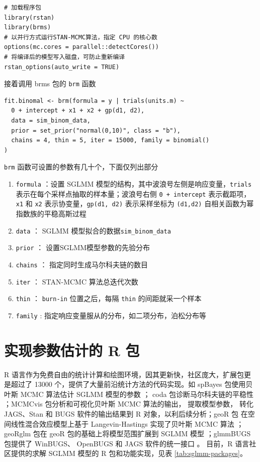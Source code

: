 \documentclass[12pt,a4paper,UTF8,twoside]{book}
\providecommand{\tightlist}{%
  \setlength{\itemsep}{0pt}\setlength{\parskip}{0pt}}
\theoremstyle{definition}
\theoremstyle{definition}
\theoremstyle{definition}
\theoremstyle{remark}
\begin{document}
\begin{verbatim}
# 加载程序包
library(rstan)
library(brms)
# 以并行方式运行STAN-MCMC算法，指定 CPU 的核心数
options(mc.cores = parallel::detectCores())
# 将编译后的模型写入磁盘，可防止重新编译
rstan_options(auto_write = TRUE)
\end{verbatim}

\noindent 接着调用 brms 包的 \texttt{brm} 函数

\begin{verbatim}
fit.binomal <- brm(formula = y | trials(units.m) ~ 
  0 + intercept + x1 + x2 + gp(d1, d2), 
  data = sim_binom_data,
  prior = set_prior("normal(0,10)", class = "b"),
  chains = 4, thin = 5, iter = 15000, family = binomial()
)    
\end{verbatim}

\texttt{brm} 函数可设置的参数有几十个，下面仅列出部分

\begin{enumerate}
\def\labelenumi{\arabic{enumi}.}
\tightlist
\item
  \texttt{formula} ：设置 SGLMM
  模型的结构，其中波浪号左侧是响应变量，\texttt{trials}
  表示在每个采样点抽取的样本量；波浪号右侧 \texttt{0\ +\ intercept}
  表示截距项， \texttt{x1} 和 \texttt{x2}
  表示协变量，\texttt{gp(d1,\ d2)} 表示采样坐标为 \texttt{(d1,d2)}
  自相关函数为幂指数族的平稳高斯过程
\item
  \texttt{data} ： SGLMM 模型拟合的数据\texttt{sim\_binom\_data}
\item
  \texttt{prior} ： 设置SGLMM模型参数的先验分布
\item
  \texttt{chains} ： 指定同时生成马尔科夫链的数目
\item
  \texttt{iter} ： STAN-MCMC 算法总迭代次数
\item
  \texttt{thin} ： \texttt{burn-in} 位置之后，每隔 \texttt{thin}
  的间距就采一个样本
\item
  \texttt{family} : 指定响应变量服从的分布，如二项分布，泊松分布等
\end{enumerate}

\hypertarget{subsec:sglmm-with-r}{%
\section{实现参数估计的 R 包}\label{subsec:sglmm-with-r}}

R
语言作为免费自由的统计计算和绘图环境，因其更新快，社区庞大，扩展包更是超过了
13000 个，提供了大量前沿统计方法的代码实现。如 spBayes 包使用贝叶斯 MCMC
算法估计 SGLMM 模型的参数 \citep{spBayes2015}； coda
包诊断马尔科夫链的平稳性 \citep{coda2006}；MCMCvis 包分析和可视化贝叶斯
MCMC 算法的输出， 提取模型参数， 转化 JAGS、Stan 和 BUGS
软件的输出结果到 R 对象，以利后续分析；geoR 包
在空间线性混合效应模型上基于 Langevin-Hastings 实现了贝叶斯 MCMC 算法
\citep{geoR2001}；geoRglm 包在 geoR 包的基础上将模型范围扩展到 SGLMM
模型 \citep{geoRglm2002}；glmmBUGS 包提供了 WinBUGS、 OpenBUGS 和 JAGS
软件的统一接口 \citep{glmmBUGS2010MCMC}。 目前，R 语言社区提供的求解
SGLMM 模型的 R 包和功能实现，见表 \ref{tab:sglmm-packages}。
\end{document}
